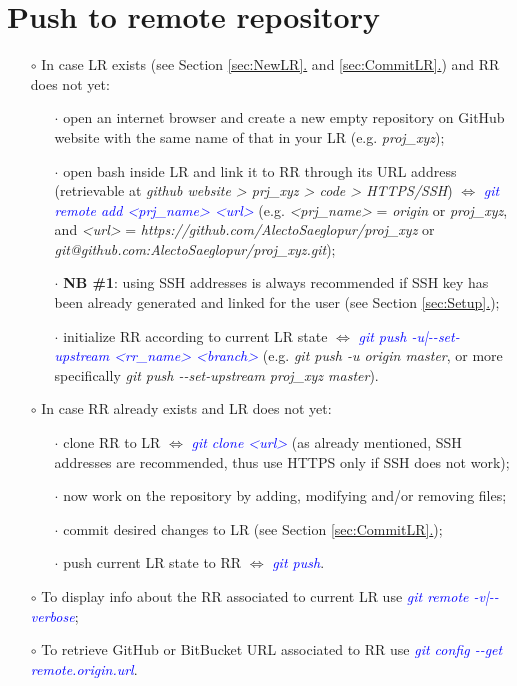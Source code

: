 \documentclass[a4paper,portrait,10pt]{article}   %
\newcommand{\mybulletlvA}{$\circ$}   %
\newcommand{\mybulletlvB}{$\cdot$}   %
\newcommand{\mydiv}{$\Leftrightarrow$ }   %
\newcommand{\mycmd}[1]{\textcolor{blue}{\textit{#1}}}   %
\newcommand{\myvspace}{\vspace{4mm}}   %
\newcommand{\mysecref}[1]{\hyperref[#1]{\ref{#1}.}}   %
\begin{document}
\section{Push to remote repository}   \label{sec:PushRR}

\begin{itemize}
\item[\mybulletlvA] In case LR exists (see Section \mysecref{sec:NewLR} and \mysecref{sec:CommitLR}) and RR does not yet:
\begin{itemize}
  \item[\mybulletlvB] open an internet browser and create a new empty repository on GitHub website with the same name of that in your LR (e.g. \textit{proj\_xyz});
  \item[\mybulletlvB] open bash inside LR and link it to RR through its URL address (retrievable at \textit{github website > prj\_xyz > code > HTTPS/SSH}) \mydiv \mycmd{git remote add <prj\_name> <url>} (e.g. \textit{<prj\_name>} = \textit{origin} or \textit{proj\_xyz}, and \textit{<url>} = \textit{https://github.com/AlectoSaeglopur/proj\_xyz} or \textit{git@github.com:AlectoSaeglopur/proj\_xyz.git});
  \item[\mybulletlvB] \textbf{NB \#1}: using SSH addresses is always recommended if SSH key has been already generated and linked for the user (see Section \mysecref{sec:Setup});
  \item[\mybulletlvB] initialize RR according to current LR state \mydiv \mycmd{git push -u|-{}-set-upstream <rr\_name> <branch>} (e.g. \textit{git push -u origin master}, or more specifically \textit{git push -{}-set-upstream proj\_xyz master}).
\end{itemize}
\myvspace

\item[\mybulletlvA] In case RR already exists and LR does not yet:
\begin{itemize}
  \item[\mybulletlvB] clone RR to LR \mydiv \mycmd{git clone <url>} (as already mentioned, SSH addresses are recommended, thus use HTTPS only if SSH does not work);
  \item[\mybulletlvB] now work on the repository by adding, modifying and/or removing files;
  \item[\mybulletlvB] commit desired changes to LR (see Section \mysecref{sec:CommitLR});
  \item[\mybulletlvB] push current LR state to RR \mydiv \mycmd{git push}.
\end{itemize}
\myvspace

\item[\mybulletlvA] To display info about the RR associated to current LR use \mycmd{git remote -v|-{}-verbose};
\myvspace

\item[\mybulletlvA] To retrieve GitHub or BitBucket URL associated to RR use \mycmd{git config -{}-get remote.origin.url}.
\end{itemize}
\myvspace
\end{document}
